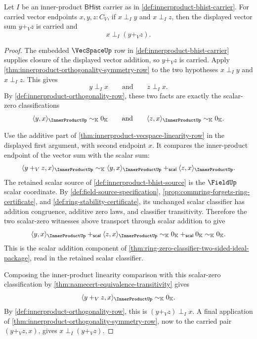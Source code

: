 \begin{theorem}
\label{thm:innerproduct-orthogonal-additivity-row}
Let $I$ be an inner-product $\mathsf{BHist}$ carrier as in
\autoref{def:innerproduct-bhist-carrier}. For carried vector endpoints
$x,y,z:C_V$, if $x\perp_I y$ and $x\perp_I z$, then the displayed vector sum
$y+_V z$ is carried and
$$
x\perp_I (y+_V z).
$$
\end{theorem}
\begin{proof}
The embedded $\VecSpaceUp$ row in
\autoref{def:innerproduct-bhist-carrier} supplies closure of the displayed
vector addition, so $y+_V z$ is carried. Apply
\autoref{thm:innerproduct-orthogonality-symmetry-row} to the two hypotheses
$x\perp_I y$ and $x\perp_I z$. This gives
$$
y\perp_I x
\qquad\text{and}\qquad
z\perp_I x.
$$
By \autoref{def:innerproduct-orthogonality-row}, these two facts are exactly the
scalar-zero classifications
$$
\langle y,x\rangle_{\InnerProductUp}\sim_{\mathbb{K}}0_{\mathbb{K}}
\qquad\text{and}\qquad
\langle z,x\rangle_{\InnerProductUp}\sim_{\mathbb{K}}0_{\mathbb{K}}.
$$

Use the additive part of \autoref{thm:innerproduct-vecspace-linearity-row} in
the displayed first argument, with second endpoint $x$. It compares the
inner-product endpoint of the vector sum with the scalar sum:
$$
\langle y+_V z,x\rangle_{\InnerProductUp}
\sim_{\mathbb{K}}
\langle y,x\rangle_{\InnerProductUp}
+_{\mathsf{scal}}
\langle z,x\rangle_{\InnerProductUp}.
$$
The retained scalar source of \autoref{def:innerproduct-bhist-source} is the
$\FieldUp$ scalar coordinate. By \autoref{def:field-source-specification},
\autoref{prop:commring-forgets-ring-certificate}, and
\autoref{def:ring-stability-certificate}, its unchanged scalar classifier has
addition congruence, additive zero laws, and classifier transitivity. Therefore
the two scalar-zero witnesses above transport through scalar addition to give
$$
\langle y,x\rangle_{\InnerProductUp}
+_{\mathsf{scal}}
\langle z,x\rangle_{\InnerProductUp}
\sim_{\mathbb{K}}
0_{\mathbb{K}}+_{\mathsf{scal}}0_{\mathbb{K}}
\sim_{\mathbb{K}}
0_{\mathbb{K}}.
$$
This is the scalar addition component of
\autoref{thm:ring-zero-classifier-two-sided-ideal-package}, read in the retained
scalar classifier.

Composing the inner-product linearity comparison with this scalar-zero
classification by \autoref{thm:namecert-equivalence-transitivity} gives
$$
\langle y+_V z,x\rangle_{\InnerProductUp}
\sim_{\mathbb{K}}
0_{\mathbb{K}}.
$$
By \autoref{def:innerproduct-orthogonality-row}, this is
$(y+_V z)\perp_I x$. A final application of
\autoref{thm:innerproduct-orthogonality-symmetry-row}, now to the carried pair
$(y+_V z,x)$, gives $x\perp_I (y+_V z)$.
\end{proof}

